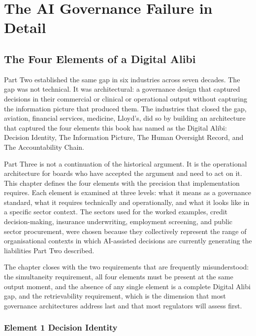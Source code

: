 
\part{The AI Governance Failure in Detail}

\chapter{The Four Elements of a Digital Alibi}

Part Two established the same gap in six industries across seven decades. The gap was not technical. It was architectural: a governance design that captured decisions in their commercial or clinical or operational output without capturing the information picture that produced them. The industries that closed the gap, aviation, financial services, medicine, Lloyd's, did so by building an architecture that captured the four elements this book has named as the Digital Alibi: Decision Identity, The Information Picture, The Human Oversight Record, and The Accountability Chain.

Part Three is not a continuation of the historical argument. It is the operational architecture for boards who have accepted the argument and need to act on it. This chapter defines the four elements with the precision that implementation requires. Each element is examined at three levels: what it means as a governance standard, what it requires technically and operationally, and what it looks like in a specific sector context. The sectors used for the worked examples, credit decision-making, insurance underwriting, employment screening, and public sector procurement, were chosen because they collectively represent the range of organisational contexts in which AI-assisted decisions are currently generating the liabilities Part Two described.

The chapter closes with the two requirements that are frequently misunderstood: the simultaneity requirement, all four elements must be present at the same output moment, and the absence of any single element is a complete Digital Alibi gap, and the retrievability requirement, which is the dimension that most governance architectures address last and that most regulators will assess first.

\scenebreak

\section{Element 1 Decision Identity}

